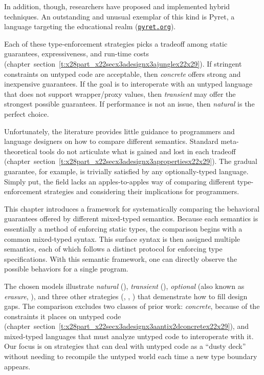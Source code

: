 \documentclass[ twoside,open=right,titlepage,numbers=noenddot,headinclude,%
                footinclude=true,cleardoublepage=empty,abstract=off,
                BCOR=5mm,paper=a4,fontsize=11pt,%
                ngerman,american,%
                parts,pdfspacing]{scrreprt}
\newcommand{\SecRef}[2]{section~#1}
\newcommand{\SecRefLocal}[3]{\hyperref[#1]{\SecRef{#2}{#3}}}
\newcommand{\Scribtexttt}[1]{{\texttt{#1}}}
\renewcommand{\SecRefLocal}[3]{section~\ref{#1}}
\begin{document}
\noindent \noindent{}In addition, though, researchers have proposed and implemented
 hybrid techniques.
An outstanding and unusual exemplar
 of this kind is Pyret, a language targeting the educational realm (\href{https://www.pyret.org}{\Scribtexttt{pyret{\hbox{\texttt{.}}}org}}).

Each of these type{-}enforcement strategies picks a tradeoff among
 static guarantees, expressiveness, and run{-}time costs (chapter~\SecRefLocal{t:x28part_x22secx3adesignx3ajunglex22x29}{4.2}{Assorted Behaviors by Example}).
If stringent constraints on untyped code are acceptable,
 then \emph{concrete} offers strong and inexpensive guarantees.
If the goal is to interoperate with an untyped language that
 does not support wrapper/proxy values,
 then \emph{transient} may offer the strongest possible guarantees.
If performance is not an issue,
 then \emph{natural} is the perfect choice.

Unfortunately, the literature provides little guidance to programmers and
 language designers on how to compare different semantics.
Standard meta{-}theoretical tools do not articulate what is gained
 and lost in each tradeoff (chapter~\SecRefLocal{t:x28part_x22secx3adesignx3apropertiesx22x29}{4.3}{Towards a Formal Comparison}).
The gradual guarantee, for example, is trivially
 satisfied by any optionally{-}typed language.
Simply put, the field lacks an apples{-}to{-}apples way of comparing different
 type{-}enforcement strategies and considering their implications for programmers.

This chapter introduces a framework for systematically comparing the behavioral
 guarantees offered by different mixed{-}typed semantics.
Because each semantics is essentially a method of enforcing static types,
 the comparison begins with a common mixed{-}typed syntax.
This surface syntax is then assigned multiple semantics,
 each of which follows a distinct protocol for enforcing type specifications.
With this semantic framework, one can directly observe the possible behaviors
 for a single program.

The chosen models illustrate \emph{natural} (\relax{$\nscr$}), \emph{transient} (\relax{$\tscr$}),
 \emph{optional} (also known as \emph{erasure}, \relax{$\escr$}),
 and three other strategies (\relax{$\cscr$}, \relax{$\fscr$}, \relax{$\ascr$}) that demenstrate how to fill design gaps.
The comparison excludes two classes of prior work:
 \emph{concrete}, because of the constraints it places on untyped code (chapter~\SecRefLocal{t:x28part_x22secx3adesignx3aantix2dconcretex22x29}{4.2.2}{Validating an Untyped Data Structure}),
 and mixed{-}typed languages that must analyze untyped code to interoperate with it.
Our focus is on strategies that can deal with untyped code
 as a {``}dusty deck{''} without needing to recompile the untyped world each time a new type boundary appears.
\end{document}
